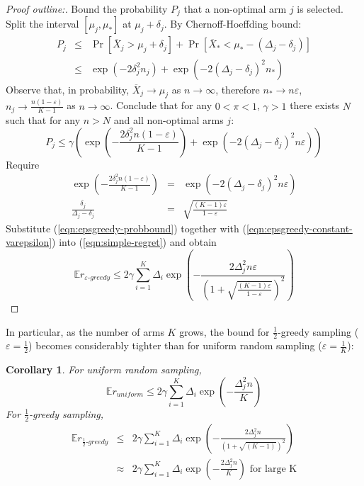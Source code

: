 \documentclass[letterpaper]{article}
\newcommand {\IE} {\ensuremath {\mathbb{E}}}
\newtheorem{crl}{Corollary}
\begin{document}
\begin{proof}[Proof outline:] 

Bound the probability $P_j$ that a non-optimal arm $j$ is selected. Split the interval
 $[\mu_j, \mu_*]$ at $\mu_j+\delta_j$. By Chernoff-Hoeffding bound:
\begin{eqnarray}
P_j&\le&\Pr[\overline X_j>\mu_j+\delta_j]+\Pr[\overline X_*<\mu_*-(\Delta_j-\delta_j)]\nonumber\\
   &\le&\exp\left(-2\delta_j^2n_j\right)+\exp\left(-2(\Delta_j-\delta_j)^2n_*\right)
\end{eqnarray}
Observe that, in probability, $\overline X_j \rightarrow \mu_j$ as $n\rightarrow\infty$, 
therefore $n_*\rightarrow n\varepsilon$, $n_j\rightarrow\frac
{n(1-\varepsilon)} {K-1}$ as $n\rightarrow \infty$. Conclude that for
any $0<\pi<1$, $\gamma>1$ there exists $N$ such that for any $n>N$ and
all non-optimal arms $j$:
\begin{equation}
P_j \le \gamma \left(\exp\left(-\frac {2\delta_j^2n(1-\varepsilon)}{K-1}\right)
+\exp\left(-2(\Delta_j-\delta_j)^2n\varepsilon\right)\right)
\label{eqn:epsgreedy-probbound}
\end{equation}
Require
\begin{eqnarray}
\exp\left(-\frac {2\delta_j^2n(1-\varepsilon)}{K-1}\right)
&=&\exp\left(-2(\Delta_j-\delta_j)^2n\varepsilon\right)\nonumber\\
\frac {\delta_j} {\Delta_j-\delta_j}&=&\sqrt{\frac {(K-1)\varepsilon} {1-\varepsilon}}
\label{eqn:epsgreedy-constant-varepsilon}
\end{eqnarray}
Substitute (\ref{eqn:epsgreedy-probbound}) together with
(\ref{eqn:epsgreedy-constant-varepsilon}) into
(\ref{eqn:simple-regret}) and obtain
\begin{equation}
\IE r_{\varepsilon\mbox{-}greedy}\le 2\gamma \sum_{i=1}^K\Delta_i\exp\left(-\frac {2\Delta_j^2n\varepsilon}
  {\left(1+\sqrt{\frac {(K-1)\varepsilon}
        {1-\varepsilon}}\right)^2}\right)
\end{equation}
\end{proof}

In particular, as the number of arms $K$ grows, the bound for $\frac 1
2$-greedy sampling ($\varepsilon=\frac 1 2$) becomes considerably tighter than for uniform
random sampling ($\varepsilon=\frac 1 K$):
\begin{crl}
For uniform random sampling, 
\begin{equation}
\IE r_{uniform}\le 2\gamma \sum_{i=1}^K\Delta_i\exp\left(-\frac {\Delta_j^2n} {K}\right)
\end{equation}
For $\frac 1 2$-greedy sampling,
\begin{eqnarray}
\IE r_{\frac 1 2\mbox{-}greedy}&\le& 2\gamma \sum_{i=1}^K\Delta_i\exp\left(-\frac {2\Delta_j^2n}
  {\left(1+\sqrt{(K-1)}\right)^2}\right)\nonumber\\
  &\approx& 2\gamma \sum_{i=1}^K\Delta_i\exp\left(-\frac
    {2\Delta_j^2n} {K}\right)\mbox{ for large K}\nonumber\\
\end{eqnarray}
\end{crl}
\end{document}
